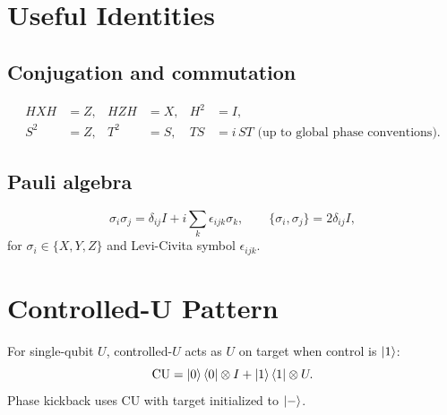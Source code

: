 \section{Useful Identities}

\subsection{Conjugation and commutation}

\begin{align}
HXH&=Z, & HZH&=X, & H^2&=I, \\
S^2&=Z, & T^2&=S, & TS&=i\,ST \text{ (up to global phase conventions)}.
\end{align}

\subsection{Pauli algebra}

\begin{equation}
\sigma_i\sigma_j=\delta_{ij}I+i\sum_k \epsilon_{ijk}\sigma_k,\qquad
\{\sigma_i,\sigma_j\}=2\delta_{ij}I,
\end{equation}
for $\sigma_i\in\{X,Y,Z\}$ and Levi-Civita symbol $\epsilon_{ijk}$.

\section{Controlled-U Pattern}

For single-qubit $U$, controlled-$U$ acts as $U$ on target when control is $\ket{1}$:
\begin{equation}
\mathrm{CU}=\ket{0}\bra{0}\otimes I+\ket{1}\bra{1}\otimes U.
\end{equation}
Phase kickback uses $\mathrm{CU}$ with target initialized to $\ket{-}$.
